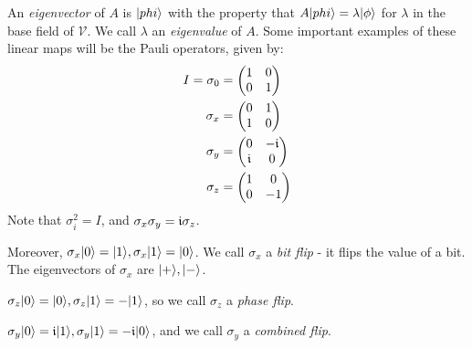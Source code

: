 \documentclass[10pt,a4paper]{article}
\begin{document}
An \emph{eigenvector} of $A$ is $|phi\rangle$ with the property that $A|phi\rangle = \lambda|\phi\rangle$ for $\lambda$ in the base field of $\mathcal{V}$. We call $\lambda$ an \emph{eigenvalue} of $A$. Some important examples of these linear maps will be the Pauli operators, given by:
\begin{align*}
I = \sigma_0 &= \begin{pmatrix}
1 & 0\\ 0 & 1
\end{pmatrix}\\
\sigma_x & = \begin{pmatrix}
0 & 1 \\ 1 & 0
\end{pmatrix}\\
\sigma_y &= \begin{pmatrix}
0 & -\mathfrak{i} \\ \mathfrak{i} & 0
\end{pmatrix}\\
\sigma_z &= \begin{pmatrix}
1 & 0 \\ 0 & -1
\end{pmatrix}
\end{align*}
Note that $\sigma_{i}^2 = I$, and $\sigma_x \sigma_y = \mathfrak{i} \sigma_z$.

Moreover, $\sigma_x|0\rangle = |1\rangle, \sigma_x|1\rangle = |0\rangle$. We call $\sigma_x$ a \emph{bit flip} - it flips the value of a bit. The eigenvectors of $\sigma_x$ are $|+\rangle, |-\rangle$.

\hspace*{-1em}$\sigma_z|0\rangle = |0\rangle, \sigma_z|1\rangle = -|1\rangle$, so we call $\sigma_z$ a \emph{phase flip}. 

\hspace*{-1em}$\sigma_y|0\rangle = \mathfrak{i}|1\rangle, \sigma_y|1\rangle=-\mathfrak{i}|0\rangle$, and we call $\sigma_y$ a \emph{combined flip}.
\end{document}
